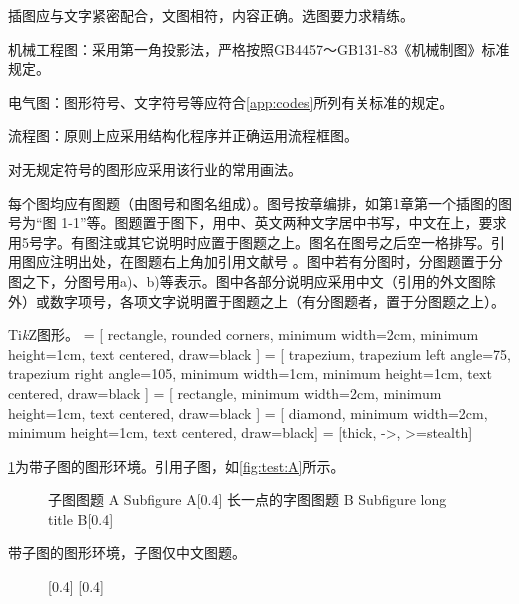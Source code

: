 插图应与文字紧密配合，文图相符，内容正确。选图要力求精练。

机械工程图：采用第一角投影法，严格按照GB4457～GB131-83《机械制图》标准规定。

电气图：图形符号、文字符号等应符合\cref{app:codes}所列有关标准的规定。

流程图：原则上应采用结构化程序并正确运用流程框图。

对无规定符号的图形应采用该行业的常用画法。

每个图均应有图题（由图号和图名组成）。图号按章编排，如第1章第一个插图的图号为“图 1-1”等。图题置于图下，用中、英文两种文字居中书写，中文在上，要求用5号字。有图注或其它说明时应置于图题之上。图名在图号之后空一格排写。引用图应注明出处，在图题右上角加引用文献号 。图中若有分图时，分图题置于分图之下，分图号用a)、b)等表示。图中各部分说明应采用中文（引用的外文图除外）或数字项号，各项文字说明置于图题之上（有分图题者，置于分图题之上）。

Ti\textit{k}Z图形。
\usetikzlibrary{shapes.geometric, arrows}
 = [
rectangle,
rounded corners,
minimum width=2cm,
minimum height=1cm,
text centered,
draw=black
]
 = [
trapezium,
trapezium left angle=75,
trapezium right angle=105,
minimum width=1cm,
minimum height=1cm,
text centered,
draw=black
]
 = [
rectangle,
minimum width=2cm,
minimum height=1cm,
text centered,
draw=black
]
 = [
diamond,
minimum width=2cm,
minimum height=1cm,
text centered,
draw=black]
 = [thick, ->, >=stealth]

\begin{figure}[htbp]
	\centering
\end{figure}

\cref{fig:test}为带子图的图形环境。引用子图，如\cref{fig:test:A}所示。
\begin{figure}[htbp]
    \centering
    \bisubcaptionbox
    {子图图题 A\label{fig:test:A}}
    {Subfigure A}[0.4\textwidth]{}%
    \qquad
    \bisubcaptionbox
    {长一点的字图图题 B\label{fig:test:B}}
    {Subfigure long title B}[0.4\textwidth]{}%
    \label{fig:test}
\end{figure}

带子图的图形环境，子图仅中文图题。
\begin{figure}[htbp]
    \centering
    [0.4\textwidth]{}%
    \qquad
    [0.4\textwidth]{}%
    \label{fig:test2}
\end{figure}

